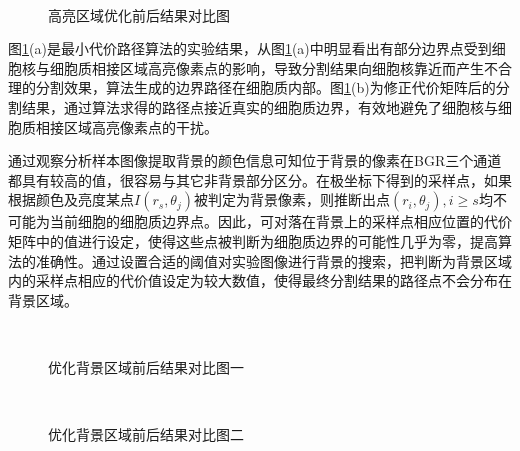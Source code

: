 \documentclass[nomlist,masters]{seuthesix}
\begin{document}
\begin{figure}[H]
\centering 
\hspace{0.02\textwidth}
\caption{高亮区域优化前后结果对比图}
\label{LocalNur}
\end{figure}

图\ref{LocalNur}(a)是最小代价路径算法的实验结果，从图\ref{LocalNur}(a)中明显看出有部分边界点受到细胞核与细胞质相接区域高亮像素点的影响，导致分割结果向细胞核靠近而产生不合理的分割效果，算法生成的边界路径在细胞质内部。图\ref{LocalNur}(b)为修正代价矩阵后的分割结果，通过算法求得的路径点接近真实的细胞质边界，有效地避免了细胞核与细胞质相接区域高亮像素点的干扰。

通过观察分析样本图像提取背景的颜色信息可知位于背景的像素在BGR三个通道都具有较高的值，很容易与其它非背景部分区分。在极坐标下得到的采样点，如果根据颜色及亮度某点$I\left ( r_{s},\theta _{j} \right )$被判定为背景像素，则推断出点$\left ( r_{i},\theta _{j} \right ),i\geq s$均不可能为当前细胞的细胞质边界点。因此，可对落在背景上的采样点相应位置的代价矩阵中的值进行设定，使得这些点被判断为细胞质边界的可能性几乎为零，提高算法的准确性。通过设置合适的阈值对实验图像进行背景的搜索，把判断为背景区域内的采样点相应的代价值设定为较大数值，使得最终分割结果的路径点不会分布在背景区域。


\begin{figure}[H]
\centering 
\hspace{0.01\textwidth}
\hspace{0.01\textwidth}
\caption{优化背景区域前后结果对比图一}
\label{backgrounda}
\end{figure}

\begin{figure}[H]
\centering 
\hspace{0.01\textwidth}
\hspace{0.01\textwidth}
\caption{优化背景区域前后结果对比图二}
\label{backgroundb}
\end{figure}
\end{document}
